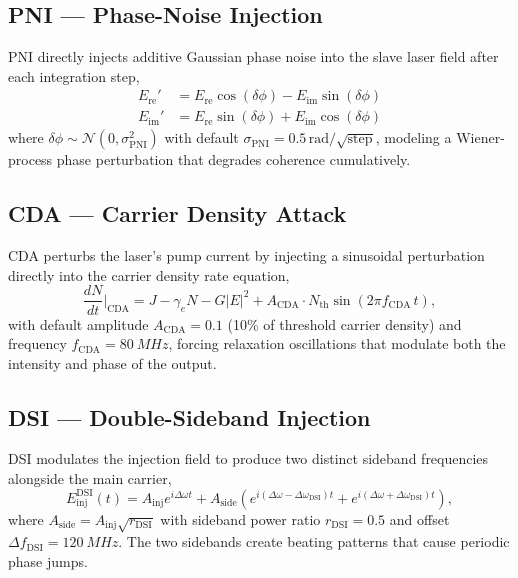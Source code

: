 \documentclass[12pt, a4paper]{report}
\begin{document}
\subsection{PNI — Phase-Noise Injection}
PNI directly injects additive Gaussian phase noise into the slave laser field after each integration step,
\begin{align}
    E_{\text{re}}' &= E_{\text{re}}\cos(\delta\phi) - E_{\text{im}}\sin(\delta\phi) \\
    E_{\text{im}}' &= E_{\text{re}}\sin(\delta\phi) + E_{\text{im}}\cos(\delta\phi)
\end{align}
where $\delta\phi \sim \mathcal{N}(0, \sigma_{\text{PNI}}^2)$ with default $\sigma_{\text{PNI}} = 0.5\,\text{rad}/\sqrt{\text{step}}$, modeling a Wiener-process phase perturbation that degrades coherence cumulatively.

\subsection{CDA — Carrier Density Attack}
CDA perturbs the laser's pump current by injecting a sinusoidal perturbation directly into the carrier density rate equation,
\begin{equation}
    \frac{dN}{dt}\bigg|_{\text{CDA}} = J - \gamma_e N - G|E|^2 + A_{\text{CDA}} \cdot N_{\text{th}} \sin(2\pi f_{\text{CDA}}\, t),
\end{equation}
with default amplitude $A_{\text{CDA}} = 0.1$ (10\% of threshold carrier density) and frequency $f_{\text{CDA}} = \SI{80}{MHz}$, forcing relaxation oscillations that modulate both the intensity and phase of the output.

\subsection{DSI — Double-Sideband Injection}
DSI modulates the injection field to produce two distinct sideband frequencies alongside the main carrier,
\begin{equation}
    E_{\text{inj}}^{\text{DSI}}(t) = A_{\text{inj}} e^{i\Delta\omega t} + A_{\text{side}}\left(e^{i(\Delta\omega - \Delta\omega_{\text{DSI}})t} + e^{i(\Delta\omega + \Delta\omega_{\text{DSI}})t}\right),
\end{equation}
where $A_{\text{side}} = A_{\text{inj}}\sqrt{r_{\text{DSI}}}$ with sideband power ratio $r_{\text{DSI}} = 0.5$ and offset $\Delta f_{\text{DSI}} = \SI{120}{MHz}$. The two sidebands create beating patterns that cause periodic phase jumps.
\end{document}
